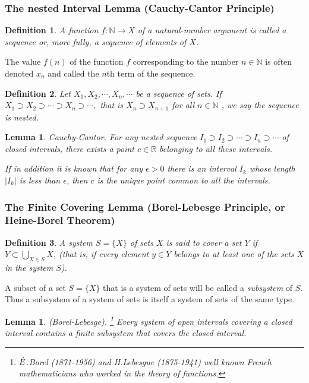 \documentclass[a4paper,12pt]{article} %
\newtheorem{definition}{Definition}[section]
\newtheorem{lemma}[theorem]{Lemma}
\begin{document}
\subsubsection{The nested Interval Lemma (Cauchy-Cantor Principle)}
\begin{definition}
    A function $f:\mathbb{N}\to X$ of a natural-number argument is called
    a sequence or, more fully, a sequence of elements of $X$.
\end{definition}

The value $f(n)$ of the function $f$ corresponding to the number 
$n\in\mathbb{N}$ is often denoted $x_n$ and called the $n$th term of 
the sequence.

\begin{definition}
    Let $X_1,X_2,\cdots,X_n,\cdots$ be a sequence of sets. If $X_1\supset X_2\supset 
    \cdots\supset X_n \supset \cdots,$ that is $X_n \supset X_{n+1}$ for all $n\in \mathbb{N}$
    , we say the sequence is nested.
\end{definition}

\begin{lemma}{Cauchy-Cantor.}
    For any nested sequence $I_1 \supset I_2 \supset \cdots \supset I_n  \supset \cdots$
    of closed intervals, there exists a point $c\in \mathbb{R}$
    belonging to all these intervals.

    If in addition it is known that for any $\epsilon >0  $
    there is an interval $I_k$ whose length $|I_k|$
    is less than $\epsilon$, then $c$ is the unique point common to all
    the intervals.
\end{lemma}

\subsubsection{The Finite Covering Lemma (Borel-Lebesge Principle,
or Heine-Borel Theorem)}
\begin{definition}
    A system $S=\{X\}$ of sets $X$ is said to cover a set $Y$ if 
    $\displaystyle Y \subset \bigcup_{X \in S} X$, (that is, if every element 
    $y\in Y$ belongs to at least one of the sets $X$ in the system $S$).
\end{definition}

A subset of a set $S = \{X\}$ that is a system of sets will be called 
a \textit{subsystem} of $S$. Thus a subsystem of a system of sets is itself a
system of sets of the same type.

\begin{lemma}{\rm (Borel-Lebesge)}. \footnote{$\Acute{E}$.Borel 
    (1871-1956) and H.Lebesgue (1875-1941) well known French 
    mathematicians who worked in the theory of functions.}
     Every system of open intervals covering a closed interval 
     contains a finite subsystem that covers the closed interval.
\end{lemma}
\end{document}
